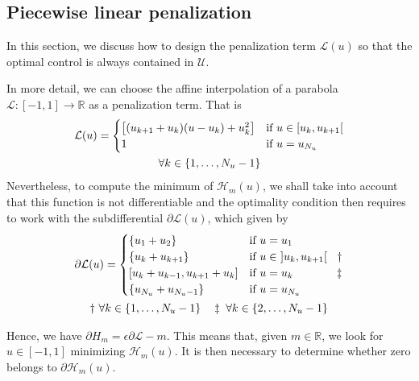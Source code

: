 \subsection{Piecewise linear penalization}

In this section, we discuss how to design the penalization term $\mathcal{L}(u)$ so that the optimal control is always contained in $\mathcal{U}$. 

In more detail, we can choose the affine interpolation of a parabola $\mathcal{L}:[-1,1] \rightarrow \mathbb{R}$ as a penalization term. That is
\begin{gather}\label{PLP}
    {\mathcal{L}(u)} = \begin{cases}
        \big[ (u_{k+1}+u_{k}) (u-u_k) + u_k^2 \big] & \text{if}  u \in [u_k,u_{k+1}[ \\
        1 & \text{if} \ u = u_{N_u} 
    \end{cases} \\
    \notag \forall k \in \{1,\dots,N_u-1\}
\end{gather}
%
Nevertheless, to compute the minimum of $\mathcal{H}_m(u)$, we shall take into account that this function is not differentiable and the optimality condition then requires to work with the subdifferential $\partial\mathcal{L}(u)$, which given by
\begin{gather}
        \partial\mathcal{L}(u)= \begin{cases}
            \{u_1 + u_2  \}   & \text{if} \ u = u_1 \\
            \{u_k + u_{k+1}\}  & \text{if} \ u \in \ ]u_k,u_{k+1}[ \hspace{0.9em} \dagger\\
            [u_k+u_{k-1} ,  u_{k+1}+u_k] & \text{if} \ u = u_k \hspace{3.9em} \ddagger \\
            \{u_{N_u} + u_{N_u-1}  \} & \text{if} \ u = u_{N_u} 
       \end{cases} \\
       \notag \dagger \ \forall k \in \{1,\dots,N_u-1\} \hspace{1em}
       \notag \ddagger  \ \forall k \in \{2,\dots,N_u-1\}
\end{gather} 

Hence, we have $\partial H_m = \epsilon\partial \mathcal{L} - m$. This means that, given $m\in \mathbb{R}$, we look for $u \in [-1,1]$ minimizing $\mathcal{H}_m(u)$. It is then necessary to determine whether zero belongs to $\partial \mathcal{H}_m(u)$.

